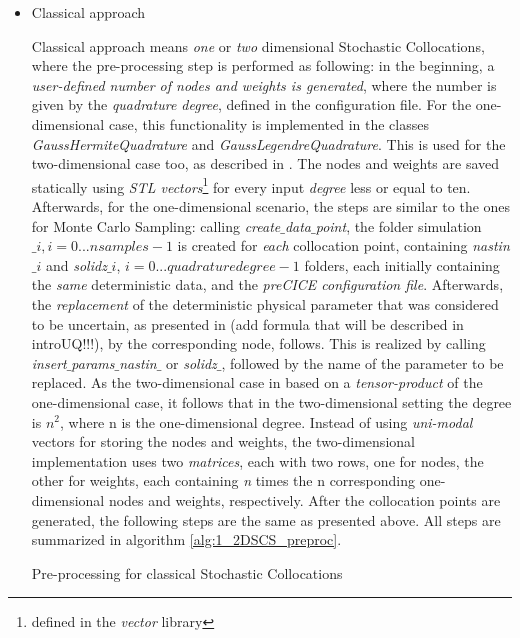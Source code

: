 \begin{itemize}
\item Classical approach 

	Classical approach means \emph{one} or \emph{two} dimensional Stochastic Collocations, where the pre-processing step is performed as following: in the beginning, a \emph{user-defined number of nodes and weights is generated}, where the number is given by the \emph{quadrature degree}, defined in the configuration file. For the one-dimensional case, this functionality is implemented in the classes \emph{GaussHermiteQuadrature} and \emph{GaussLegendreQuadrature}. This is used for the two-dimensional case too, as described in . The nodes and weights are saved statically using \emph{STL vectors}\footnote{defined in the \emph{vector} library} for every input \emph{degree} less or equal to ten. Afterwards, for the one-dimensional scenario, the steps are similar to the ones for Monte Carlo Sampling: calling \emph{create$\_$data$\_$point}, the folder simulation$\_i, i = 0...nsamples-1$ is created for \emph{each} collocation point, containing \emph{nastin$\_i$} and \emph{solidz$\_i$}, $i = 0...quadrature degree-1$ folders, each initially containing the \emph{same} deterministic data, and the \emph{preCICE configuration file}. Afterwards, the \emph{replacement} of the deterministic physical parameter that was considered to be uncertain, as presented in (add formula that will be described in introUQ!!!), by the corresponding node, follows. This is realized by calling \emph{insert$\_$params$\_$nastin$\_$} or \emph{solidz$\_$}, followed by the name of the parameter to be replaced. As the two-dimensional case in based on a \emph{tensor-product} of the one-dimensional case, it follows that in the two-dimensional setting the degree is $n^2$, where n is the one-dimensional degree. Instead of using \emph{uni-modal} vectors for storing the nodes and weights, the two-dimensional implementation uses two \emph{matrices}, each with two rows, one for nodes, the other for weights, each containing \emph{n} times the {n} corresponding one-dimensional nodes and weights, respectively. After the collocation points are generated, the following steps are the same as presented above. All steps are summarized in algorithm \ref{alg:1_2DSCS_preproc}.
\begin{algorithm}
\caption{Pre-processing for classical Stochastic Collocations
\label{alg:1_2DSCS_preproc}}
  \begin{algorithmic}[1]

\end{algorithmic}
\end{algorithm}
\end{itemize}
